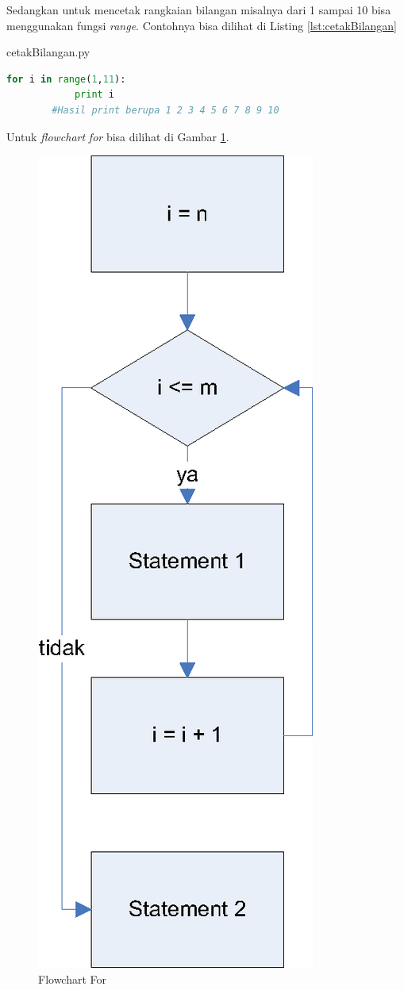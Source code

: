 Sedangkan untuk mencetak rangkaian bilangan misalnya dari 1 sampai 10 bisa menggunakan fungsi \textit{range}. Contohnya bisa dilihat di Listing \ref{lst:cetakBilangan}
\begin{listprog}{cetakBilangan.py}
	\label{lst:cetakBilangan}
	\begin{lstlisting}[language=Python]
		for i in range(1,11):
			print i
		#Hasil print berupa 1 2 3 4 5 6 7 8 9 10
	\end{lstlisting}
\end{listprog}

Untuk \textit{flowchart} \textit{for} bisa dilihat di Gambar \ref{fig:flowchartFor}.
\begin{figure}%
\centering
\includegraphics[scale=0.6]{fig/flowchart-FOR.eps}%
\caption{Flowchart For}%
\label{fig:flowchartFor}%
\end{figure}

